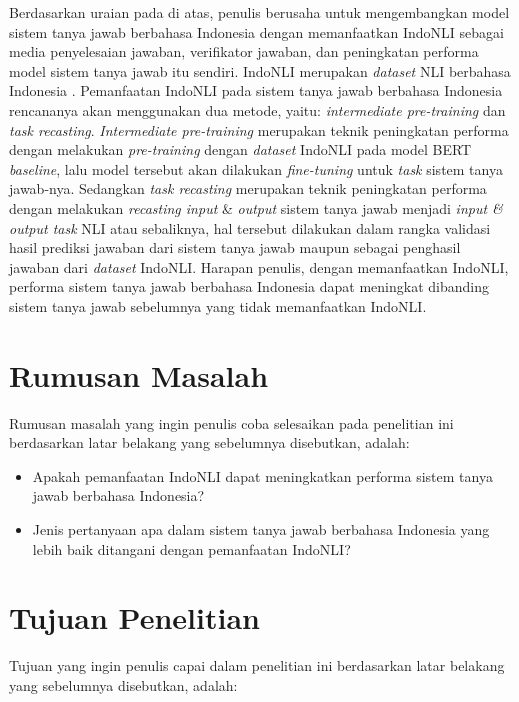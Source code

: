 Berdasarkan uraian pada di atas, penulis berusaha untuk mengembangkan model sistem tanya jawab berbahasa Indonesia dengan memanfaatkan IndoNLI sebagai media penyelesaian jawaban, verifikator jawaban, dan peningkatan performa model sistem tanya jawab itu sendiri. IndoNLI merupakan \emph{dataset} NLI berbahasa Indonesia \citep{mahendra-etal-2021-indonli}. Pemanfaatan IndoNLI pada sistem tanya jawab berbahasa Indonesia rencananya akan menggunakan dua metode, yaitu: \emph{intermediate pre-training} dan \emph{task recasting}. \emph{Intermediate pre-training} merupakan teknik peningkatan performa dengan melakukan \emph{pre-training} dengan \emph{dataset} IndoNLI pada model BERT \emph{baseline}, lalu model tersebut akan dilakukan \emph{fine-tuning} untuk \emph{task} sistem tanya jawab-nya. Sedangkan \emph{task recasting} merupakan teknik peningkatan performa dengan melakukan \emph{recasting input} \& \emph{output} sistem tanya jawab menjadi \emph{input \& output task} NLI atau sebaliknya, hal tersebut dilakukan dalam rangka validasi hasil prediksi jawaban dari sistem tanya jawab maupun sebagai penghasil jawaban dari \emph{dataset} IndoNLI. Harapan penulis, dengan memanfaatkan IndoNLI, performa sistem tanya jawab berbahasa Indonesia dapat meningkat dibanding sistem tanya jawab sebelumnya yang tidak memanfaatkan IndoNLI.

\section{Rumusan Masalah}
Rumusan masalah yang ingin penulis coba selesaikan pada penelitian ini berdasarkan latar belakang yang sebelumnya disebutkan, adalah:

\begin{itemize}

    \item Apakah pemanfaatan IndoNLI dapat meningkatkan performa sistem tanya jawab berbahasa Indonesia?

    \item Jenis pertanyaan apa dalam sistem tanya jawab berbahasa Indonesia yang lebih baik ditangani dengan pemanfaatan IndoNLI?
    
\end{itemize}

\section{Tujuan Penelitian}
Tujuan yang ingin penulis capai dalam penelitian ini berdasarkan latar belakang yang sebelumnya disebutkan, adalah:

